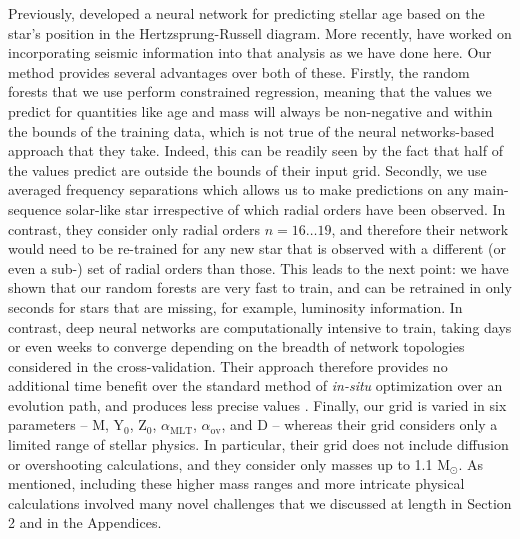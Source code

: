\documentclass[manuscript]{aastex}
\begin{document}
Previously, \citet{pulone1997age} developed a neural network for predicting stellar age based on the star's position in the Hertzsprung-Russell diagram. More recently, \citet{2016arXiv160200902V} have worked on incorporating seismic information into that analysis as we have done here. Our method provides several advantages over both of these. Firstly, the random forests that we use perform constrained regression, meaning that the values we predict for quantities like age and mass will always be non-negative and within the bounds of the training data, which is not true of the neural networks-based approach that they take. Indeed, this can be readily seen by the fact that half of the values \citet{2016arXiv160200902V} predict are outside the bounds of their input grid. Secondly, we use averaged frequency separations which allows us to make predictions on any main-sequence solar-like star irrespective of which radial orders have been observed. In contrast, they consider only radial orders $n=16\ldots 19$, and therefore their network would need to be re-trained for any new star that is observed with a different (or even a sub-) set of radial orders than those. This leads to the next point: we have shown that our random forests are very fast to train, and can be retrained in only seconds for stars that are missing, for example, luminosity information. In contrast, deep neural networks are computationally intensive to train, taking days or even weeks to converge depending on the breadth of network topologies considered in the cross-validation. Their approach therefore provides no additional time benefit over the standard method of \emph{in-situ} optimization over an evolution path, and produces less precise values \citep[][see their Section 3]{2016arXiv160200902V}. Finally, our grid is varied in six parameters -- M, Y$_0$, Z$_0$, $\alpha_{\text{MLT}}$, $\alpha_{\text{ov}}$, and D -- whereas their grid considers only a limited range of stellar physics. In particular, their grid does not include diffusion or overshooting calculations, and they consider only masses up to 1.1 M$_\odot$. As mentioned, including these higher mass ranges and more intricate physical calculations involved many novel challenges that we discussed at length in Section 2 and in the Appendices.
\end{document}
